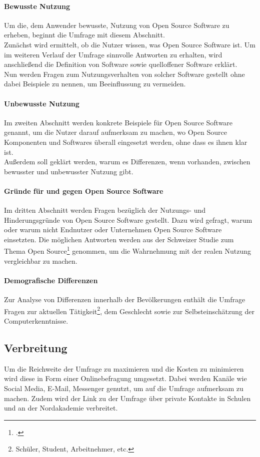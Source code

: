 \documentclass[a4paper]{article}
\begin{document}
			\paragraph{Bewusste Nutzung}
				Um die, dem Anwender bewusste, Nutzung von Open Source Software zu erheben, beginnt die Umfrage mit diesem Abschnitt.\\
				Zunächst wird ermittelt, ob die Nutzer wissen, was Open Source Software ist. Um im weiteren Verlauf der Umfrage sinnvolle Antworten zu erhalten, wird anschließend die Definition von Software sowie quelloffener Software erklärt.\\
				Nun werden Fragen zum Nutzungsverhalten von solcher Software gestellt ohne dabei Beispiele zu nennen, um Beeinflussung zu vermeiden.
			
			\paragraph{Unbewusste Nutzung}
				Im zweiten Abschnitt werden konkrete Beispiele für Open Source Software genannt, um die Nutzer darauf aufmerksam zu machen, wo Open Source Komponenten und Softwares überall eingesetzt werden, ohne dass es ihnen klar ist.\\
				Außerdem soll geklärt werden, warum es Differenzen, wenn vorhanden, zwischen bewusster und unbewusster Nutzung gibt.
			
			\paragraph{Gründe für und gegen Open Source Software}
				Im dritten Abschnitt werden Fragen bezüglich der Nutzungs- und Hinderungsgründe von Open Source Software gestellt. Dazu wird gefragt, warum oder warum nicht Endnutzer oder Unternehmen Open Source Software einsetzten. Die möglichen Antworten werden aus der Schweizer Studie zum Thema Open Source\footcite{oss:studie} genommen, um die Wahrnehmung mit der realen Nutzung vergleichbar zu machen.
			
			\paragraph{Demografische Differenzen}
				Zur Analyse von Differenzen innerhalb der Bevölkerungen enthält die Umfrage Fragen zur aktuellen Tätigkeit\footnote{Schüler, Student, Arbeitnehmer, etc.}, dem Geschlecht sowie zur Selbsteinschätzung der Computerkenntnisse.
				
		\subsection{Verbreitung}
			Um die Reichweite der Umfrage zu maximieren und die Kosten zu minimieren wird diese in Form einer Onlinebefragung umgesetzt. Dabei werden Kanäle wie Social Media, E-Mail, Messenger genutzt, um auf die Umfrage aufmerksam zu machen. Zudem wird der Link zu der Umfrage über private Kontakte in Schulen und an der Nordakademie verbreitet.
	   
\end{document}

